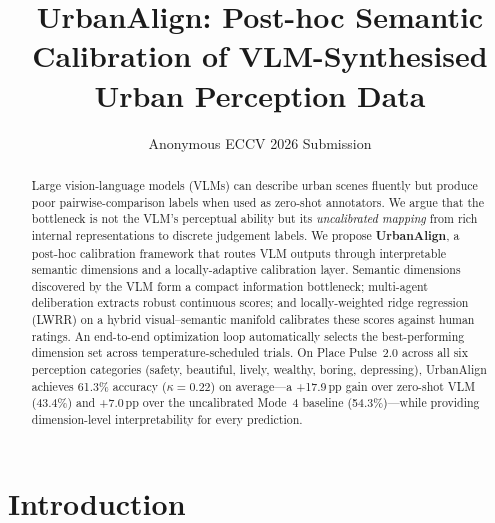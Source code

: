 \documentclass[runningheads]{llncs}
\begin{document}
\title{UrbanAlign: Post-hoc Semantic Calibration of VLM-Synthesised Urban Perception Data}


\author{Anonymous ECCV 2026 Submission}

\maketitle

\begin{abstract}
Large vision-language models (VLMs) can describe urban scenes fluently but produce poor pairwise-comparison labels when used as zero-shot annotators.
We argue that the bottleneck is not the VLM's perceptual ability but its \emph{uncalibrated mapping} from rich internal representations to discrete judgement labels.
We propose \textbf{UrbanAlign}, a post-hoc calibration framework that routes VLM outputs through interpretable semantic dimensions and a locally-adaptive calibration layer.
Semantic dimensions discovered by the VLM form a compact information bottleneck; multi-agent deliberation extracts robust continuous scores; and locally-weighted ridge regression (LWRR) on a hybrid visual--semantic manifold calibrates these scores against human ratings.
An end-to-end optimization loop automatically selects the best-performing dimension set across temperature-scheduled trials.
On Place Pulse~2.0 across all six perception categories (safety, beautiful, lively, wealthy, boring, depressing), UrbanAlign achieves 61.3\% accuracy ($\kappa{=}0.22$) on average---a +17.9\,pp gain over zero-shot VLM (43.4\%) and +7.0\,pp over the uncalibrated Mode~4 baseline (54.3\%)---while providing dimension-level interpretability for every prediction.

\end{abstract}


\section{Introduction}
\label{sec:intro}
\end{document}
